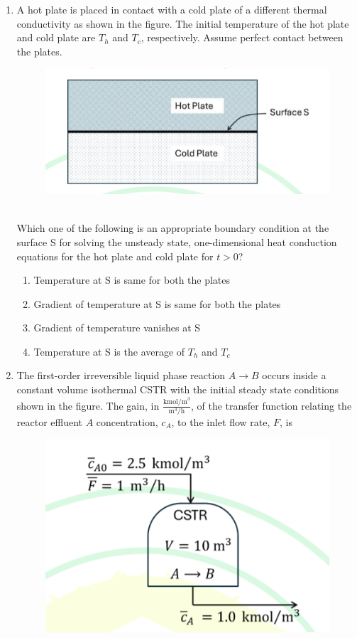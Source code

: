 \documentclass[journal,12pt,onecolumn]{IEEEtran}
\theoremstyle{remark}
\begin{document}
\begin{enumerate}
		\item A hot plate is placed in contact with a cold plate of a different thermal conductivity as shown in the figure. The initial temperature  of the hot plate and cold plate are $T_h$ and $T_c$, respectively. Assume perfect contact between the plates.\\
		\begin{figure}[h]
			\centering
			\includegraphics[width=0.6\columnwidth]{q38.png}
			\caption*{}
			\label{fig:q38}
		\end{figure} \\

		Which one of the following is an appropriate boundary condition at the surface S for solving the unsteady state, one-dimensional heat conduction equations for the hot plate and cold plate for $t > 0$?

	\newpage	
		\hfill{}
		
		\begin{enumerate}
			\item Temperature at S is same for both the plates
			\item Gradient of temperature at S is same for both the plates
			\item Gradient of temperature vanishes at S
			\item Temperature at S is the average of $T_h$ and $T_c$
		\end{enumerate}
		
		\item The first-order irreversible liquid phase reaction $A \longrightarrow B$ occurs inside a constant volume  isothermal CSTR with the initial steady state conditions shown in the figure. The gain, in $\frac{\text{kmol/m}^3}{\text{m}^3\text{/h}}$, of the transfer function relating the reactor effluent $A$ concentration, $c_A$, to the inlet flow rate, $F$, is
		
		\begin{figure}[h]
			\centering
			\includegraphics[width=0.6\columnwidth]{q39.png}
			\caption*{}
			\label{fig:q39}
		\end{figure}
		

\end{enumerate}
\end{document}
